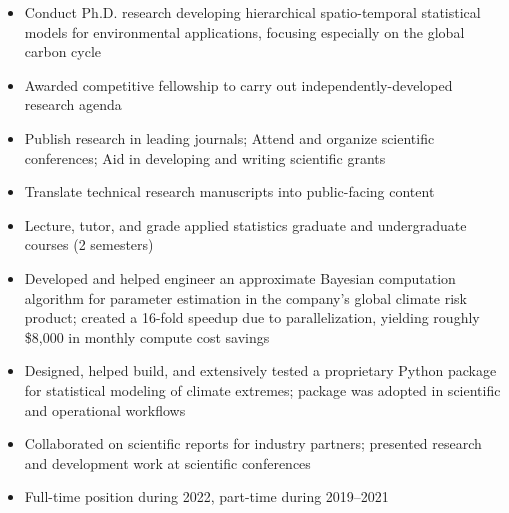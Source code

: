 \documentclass[10pt,a4paper,ragged2e,withhyper]{altacv}
\begin{document}
\vspace{0.1em}
\begin{paracol}{2}



  \begin{itemize}
    \item Conduct Ph.D. research developing hierarchical spatio-temporal statistical models for environmental applications, focusing especially on the global carbon cycle
    \item Awarded competitive fellowship to carry out independently-developed research agenda
    \item Publish research in leading journals; Attend and organize scientific conferences; Aid in developing and writing scientific grants
    \item Translate technical research manuscripts into public-facing content
    \item Lecture, tutor, and grade applied statistics graduate and undergraduate courses (2 semesters)
  \end{itemize}

  \vspace{-0.5em}
  \divider

  \begin{itemize}
    \item Developed and helped engineer an approximate Bayesian computation algorithm for parameter estimation in the company's global climate risk product; created a 16-fold speedup due to parallelization, yielding roughly \$8,000 in monthly compute cost savings
    \item Designed, helped build, and extensively tested a proprietary Python package for statistical modeling of climate extremes; package was adopted in scientific and operational workflows
    \item Collaborated on scientific reports for industry partners; presented research and development work at scientific conferences
    \item Full-time position during 2022, part-time during 2019--2021
  \end{itemize}

  \vspace{-0.5em}
  \divider


\end{paracol}
\end{document}
